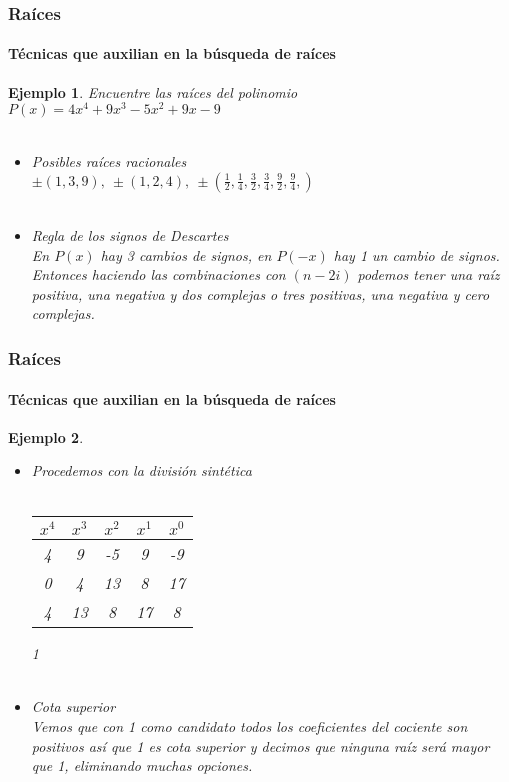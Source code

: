 \documentclass[11pt]{beamer}
\newtheorem{ejem}{Ejemplo}
\begin{document}
\begin{frame}
\frametitle{Raíces}
\framesubtitle{Técnicas que auxilian en la búsqueda de raíces}
\begin{ejem}
Encuentre las raíces del polinomio $P(x) = 4x^4 + 9x^3 -5x^2 + 9x -9$\\ \hspace{0cm} \\
\begin{itemize}
\item Posibles raíces racionales\\
$\pm (1,3,9),~\pm (1,2,4),~\pm (\frac{1}{2},\frac{1}{4},\frac{3}{2},\frac{3}{4},\frac{9}{2},\frac{9}{4},)$ \\ \hspace{0cm} \\
\item Regla de los signos de Descartes\\
En $P(x)$ hay 3 cambios de signos, en $P(-x)$ hay 1 un cambio de signos. Entonces haciendo las combinaciones con $(n-2i)$ podemos tener una raíz positiva, una negativa y dos complejas o tres positivas, una negativa y cero complejas.
\end{itemize}
\end{ejem}
\end{frame}

\begin{frame}
\frametitle{Raíces}
\framesubtitle{Técnicas que auxilian en la búsqueda de raíces}
\begin{ejem}
\begin{itemize}
\item Procedemos con la división sintética\\ \hspace{0cm} \\
\begin{tabular}{c|c|c|c|c|}
$x^4$ & $x^3$ & $x^2$ & $x^1$ & $x^0$\\ \hline
4 & 9 & -5 & 9 & -9\\ 
0 & 4 & 13 & 8 & 17 \\ \hline
4 & 13 & 8 & 17 & 8
\end{tabular}
1\\ \hspace{0cm} \\
\item Cota superior\\
Vemos que con 1 como candidato todos los coeficientes del cociente son positivos así que 1 es cota superior y decimos que ninguna raíz será mayor que 1, eliminando muchas opciones.
\end{itemize}
\end{ejem}
\end{frame}
\end{document}
